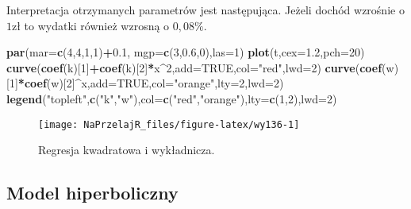 \documentclass[polish,]{book}
\newenvironment{Shaded}{\begin{snugshade}}{\end{snugshade}}
\newcommand{\DataTypeTok}[1]{\textcolor[rgb]{0.13,0.29,0.53}{#1}}
\newcommand{\DecValTok}[1]{\textcolor[rgb]{0.00,0.00,0.81}{#1}}
\newcommand{\FloatTok}[1]{\textcolor[rgb]{0.00,0.00,0.81}{#1}}
\newcommand{\KeywordTok}[1]{\textcolor[rgb]{0.13,0.29,0.53}{\textbf{#1}}}
\newcommand{\NormalTok}[1]{#1}
\newcommand{\OperatorTok}[1]{\textcolor[rgb]{0.81,0.36,0.00}{\textbf{#1}}}
\newcommand{\OtherTok}[1]{\textcolor[rgb]{0.56,0.35,0.01}{#1}}
\newcommand{\StringTok}[1]{\textcolor[rgb]{0.31,0.60,0.02}{#1}}
\begin{document}
Interpretacja otrzymanych parametrów jest następująca. Jeżeli dochód wzrośnie o
\(1\)zł to wydatki również wzrosną o \(0,08\%\).

\begin{Shaded}
\begin{Highlighting}[]
\KeywordTok{par}\NormalTok{(}\DataTypeTok{mar=}\KeywordTok{c}\NormalTok{(}\DecValTok{4}\NormalTok{,}\DecValTok{4}\NormalTok{,}\DecValTok{1}\NormalTok{,}\DecValTok{1}\NormalTok{)}\OperatorTok{+}\FloatTok{0.1}\NormalTok{, }\DataTypeTok{mgp=}\KeywordTok{c}\NormalTok{(}\DecValTok{3}\NormalTok{,}\FloatTok{0.6}\NormalTok{,}\DecValTok{0}\NormalTok{),}\DataTypeTok{las=}\DecValTok{1}\NormalTok{)}
\KeywordTok{plot}\NormalTok{(t,}\DataTypeTok{cex=}\FloatTok{1.2}\NormalTok{,}\DataTypeTok{pch=}\DecValTok{20}\NormalTok{)}
\KeywordTok{curve}\NormalTok{(}\KeywordTok{coef}\NormalTok{(k)[}\DecValTok{1}\NormalTok{]}\OperatorTok{+}\KeywordTok{coef}\NormalTok{(k)[}\DecValTok{2}\NormalTok{]}\OperatorTok{*}\NormalTok{x}\OperatorTok{^}\DecValTok{2}\NormalTok{,}\DataTypeTok{add=}\OtherTok{TRUE}\NormalTok{,}\DataTypeTok{col=}\StringTok{"red"}\NormalTok{,}\DataTypeTok{lwd=}\DecValTok{2}\NormalTok{)}
\KeywordTok{curve}\NormalTok{(}\KeywordTok{coef}\NormalTok{(w)[}\DecValTok{1}\NormalTok{]}\OperatorTok{*}\KeywordTok{coef}\NormalTok{(w)[}\DecValTok{2}\NormalTok{]}\OperatorTok{^}\NormalTok{x,}\DataTypeTok{add=}\OtherTok{TRUE}\NormalTok{,}\DataTypeTok{col=}\StringTok{"orange"}\NormalTok{,}\DataTypeTok{lty=}\DecValTok{2}\NormalTok{,}\DataTypeTok{lwd=}\DecValTok{2}\NormalTok{)}
\KeywordTok{legend}\NormalTok{(}\StringTok{"topleft"}\NormalTok{,}\KeywordTok{c}\NormalTok{(}\StringTok{"k"}\NormalTok{,}\StringTok{"w"}\NormalTok{),}\DataTypeTok{col=}\KeywordTok{c}\NormalTok{(}\StringTok{"red"}\NormalTok{,}\StringTok{"orange"}\NormalTok{),}\DataTypeTok{lty=}\KeywordTok{c}\NormalTok{(}\DecValTok{1}\NormalTok{,}\DecValTok{2}\NormalTok{),}\DataTypeTok{lwd=}\DecValTok{2}\NormalTok{)}
\end{Highlighting}
\end{Shaded}

\begin{figure}[h]

{\centering \texttt{[image: NaPrzelajR\_files/figure-latex/wy136-1]} 

}

\caption{Regresja kwadratowa i wykładnicza.}\label{fig:wy136}
\end{figure}

\hypertarget{part_13.3.3}{%
\subsection{Model hiperboliczny}\label{part_13.3.3}}
\end{document}
